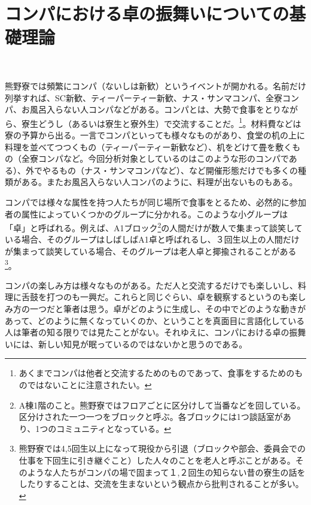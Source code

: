 \section{コンパにおける卓の振舞いについての基礎理論}
\begin{multicols}{2}
\\
\par
熊野寮では頻繁にコンパ（ないしは新歓）というイベントが開かれる。名前だけ列挙すれば、SC新歓、ティーパーティー新歓、ナス・サンマコンパ、全寮コンパ、お風呂入らない人コンパなどがある。コンパとは、大勢で食事をとりながら、寮生どうし（あるいは寮生と寮外生）で交流することだ。\footnote{あくまでコンパは他者と交流するためのものであって、食事をするためのものではないことに注意されたい。}。材料費などは寮の予算から出る。一言でコンパといっても様々なものがあり、食堂の机の上に料理を並べてつつくもの（ティーパーティー新歓など）、机をどけて畳を敷くもの（全寮コンパなど。今回分析対象としているのはこのような形のコンパである）、外でやるもの（ナス・サンマコンパなど）、など開催形態だけでも多くの種類がある。またお風呂入らない人コンパのように、料理が出ないものもある。
\par
コンパでは様々な属性を持つ人たちが同じ場所で食事をとるため、必然的に参加者の属性によっていくつかのグループに分かれる。このような小グループは「卓」と呼ばれる。例えば、A1ブロック\footnote{A棟1階のこと。熊野寮ではフロアごとに区分けして当番などを回している。区分けされた一つ一つをブロックと呼ぶ。各ブロックには1つ談話室があり、1つのコミュニティとなっている。}の人間だけが数人で集まって談笑している場合、そのグループはしばしばA1卓と呼ばれるし、３回生以上の人間だけが集まって談笑している場合、そのグループは老人卓と揶揄されることがある\footnote{熊野寮では4,5回生以上になって現役から引退（ブロックや部会、委員会での仕事を下回生に引き継ぐこと）した人々のことを老人と呼ぶことがある。そのような人たちがコンパの場で固まって１,２回生の知らない昔の寮生の話をしたりすることは、交流を生まないという観点から批判されることが多い。}。
\par
コンパの楽しみ方は様々なものがある。ただ人と交流するだけでも楽しいし、料理に舌鼓を打つのも一興だ。これらと同じぐらい、卓を観察するというのも楽しみ方の一つだと筆者は思う。卓がどのように生成し、その中でどのような動きがあって、どのように無くなっていくのか、ということを真面目に言語化している人は筆者の知る限りでは見たことがない。それゆえに、コンパにおける卓の振舞いには、新しい知見が眠っているのではないかと思うのである。
\par

\end{multicols}
